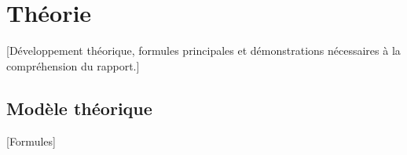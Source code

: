 \chapter{Théorie}
\label{chap:theorie}

[Développement théorique, formules principales et démonstrations nécessaires à la compréhension du rapport.]

\section{Modèle théorique}

[Formules]
